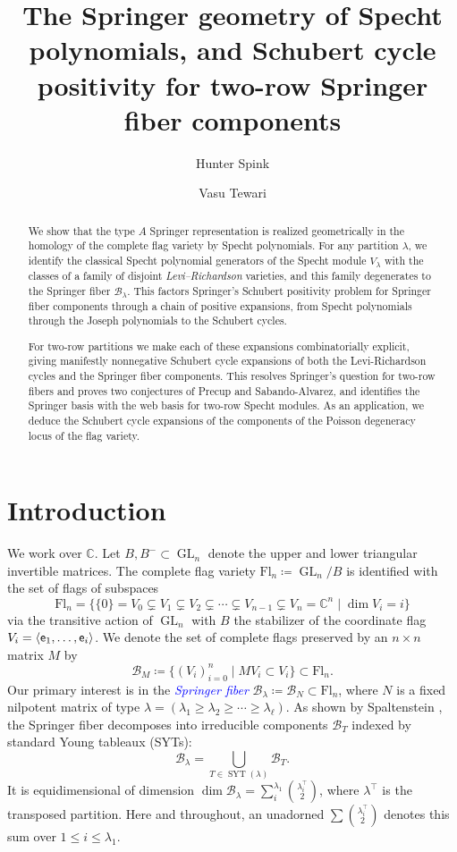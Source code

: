 \documentclass[11pt]{amsart}
\date{}
\title[Two-row Springer fiber components]{The Springer geometry of Specht polynomials, and Schubert cycle positivity for two-row Springer fiber components}
\author{Hunter Spink}
\author{Vasu Tewari}
\theoremstyle{definition}
\numberwithin{equation}{section}
\newcommand{\suchthat}{\;|\;}
\newcommand{\fl}[1]{\mathrm{Fl}_{#1}}
\renewcommand\emph[1]{\textcolor{blue}{\textit{#1}}} %
\newcommand{\syt}{\operatorname{SYT}} %
\newcommand{\gl}{\operatorname{GL}}
\begin{document}
\begin{abstract}
We show that the type $A$ Springer representation is realized geometrically in the
homology of the complete flag variety by Specht polynomials.
For any partition
$\lambda$, we identify the classical Specht polynomial generators of the Specht module
$V_\lambda$ with the classes of a family of disjoint \textit{Levi--Richardson} varieties, and this family degenerates to the Springer fiber $\mathcal{B}_\lambda$.
This factors Springer's Schubert positivity problem for Springer fiber components through a chain of positive
expansions, from Specht polynomials through the Joseph polynomials to the Schubert
cycles.

For two-row partitions we make each of these expansions combinatorially
explicit, giving manifestly nonnegative Schubert cycle expansions of both the
Levi-Richardson cycles and the Springer fiber components. This resolves Springer's
question for two-row fibers and proves two conjectures of Precup and Sabando-Alvarez, and
identifies the Springer basis with the web basis for two-row Specht modules. As an
application, we deduce the Schubert cycle expansions of the components of the Poisson
degeneracy locus of the flag variety.
\end{abstract}

\maketitle


\section{Introduction}
We work over $\mathbb{C}$. Let $B,B^-\subset \gl_n$ denote the upper and lower triangular invertible matrices. The complete flag variety $\fl{n}\coloneqq \gl_n/B$ is identified with the set of flags of subspaces $$\fl{n}=\{\{0\}=V_0\subsetneq V_1\subsetneq V_2\subsetneq \cdots \subsetneq V_{n-1}\subsetneq V_n=\mathbb{C}^n\suchthat \dim V_i=i\}$$
via the transitive action of $\gl_n$ with $B$ the stabilizer of the coordinate flag $V_i=\langle {\sf e}_1,\ldots,{\sf e}_i\rangle$. We denote the set of complete flags preserved by an $n\times n$ matrix $M$ by
$$\mathcal{B}_M\coloneqq \{(V_i)_{i=0}^{n}\suchthat MV_i\subset V_i\}\subset \fl{n}.$$
Our primary interest is in the \emph{Springer fiber}
$\mathcal{B}_\lambda\coloneqq \mathcal{B}_N\subset \fl{n}$, where $N$ is a fixed nilpotent matrix of type $\lambda=(\lambda_1\ge \lambda_2\ge \cdots \ge \lambda_\ell)$.
As shown by Spaltenstein \cite{Spa76}, the Springer fiber decomposes into irreducible components $\mathcal{B}_T$ indexed by standard Young tableaux (SYTs):
$$\mathcal{B}_\lambda=\bigcup_{T\in \syt(\lambda)}\mathcal{B}_T.$$
It is equidimensional of dimension $\dim \mathcal{B}_\lambda=\sum_{i}^{\lambda_1} \binom{\lambda_i^{\top}}{2}$, where $\lambda^{\top}$ is the transposed partition.
Here and throughout, an unadorned $\sum\binom{\lambda_i^{\top}}{2}$ denotes this sum over $1\le i\le \lambda_1$.
\end{document}
